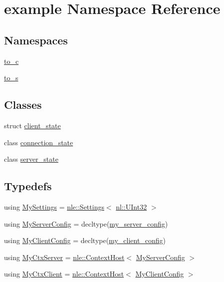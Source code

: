 \hypertarget{namespaceexample}{}\section{example Namespace Reference}
\label{namespaceexample}
\subsection*{Namespaces}
\begin{DoxyCompactItemize}
\item 
 \hyperlink{namespaceexample_1_1to__c}{to\+\_\+c}
\item 
 \hyperlink{namespaceexample_1_1to__s}{to\+\_\+s}
\end{DoxyCompactItemize}
\subsection*{Classes}
\begin{DoxyCompactItemize}
\item 
struct \hyperlink{structexample_1_1client__state}{client\+\_\+state}
\item 
class \hyperlink{classexample_1_1connection__state}{connection\+\_\+state}
\item 
class \hyperlink{classexample_1_1server__state}{server\+\_\+state}
\end{DoxyCompactItemize}
\subsection*{Typedefs}
\begin{DoxyCompactItemize}
\item 
using \hyperlink{namespaceexample_a5efa1dbb95bf11993a49738e533e7d0a}{My\+Settings} = \hyperlink{structexperiment_1_1Settings}{nle\+::\+Settings}$<$ \hyperlink{namespacenl_a5a2105bdb0a0734402590ce0805d7e31}{nl\+::\+U\+Int32} $>$
\item 
using \hyperlink{namespaceexample_af793395d62fc2b1e6ffb8fa73d751c26}{My\+Server\+Config} = decltype(\hyperlink{namespaceexample_ac04453c909e716e9769692290761b844}{my\+\_\+server\+\_\+config})
\item 
using \hyperlink{namespaceexample_a1d0fadf5159e96dd9c1f2c1d645ed430}{My\+Client\+Config} = decltype(\hyperlink{namespaceexample_a2e75dd524031f59d04a53e5073228ac0}{my\+\_\+client\+\_\+config})
\item 
using \hyperlink{namespaceexample_a691724c505d8b776cc3d6e6ecdd86c30}{My\+Ctx\+Server} = \hyperlink{classexperiment_1_1ContextHost}{nle\+::\+Context\+Host}$<$ \hyperlink{namespaceexample_af793395d62fc2b1e6ffb8fa73d751c26}{My\+Server\+Config} $>$
\item 
using \hyperlink{namespaceexample_a15f26e1f0bedfa575b4f5832a2b679b5}{My\+Ctx\+Client} = \hyperlink{classexperiment_1_1ContextHost}{nle\+::\+Context\+Host}$<$ \hyperlink{namespaceexample_a1d0fadf5159e96dd9c1f2c1d645ed430}{My\+Client\+Config} $>$
\end{DoxyCompactItemize}
